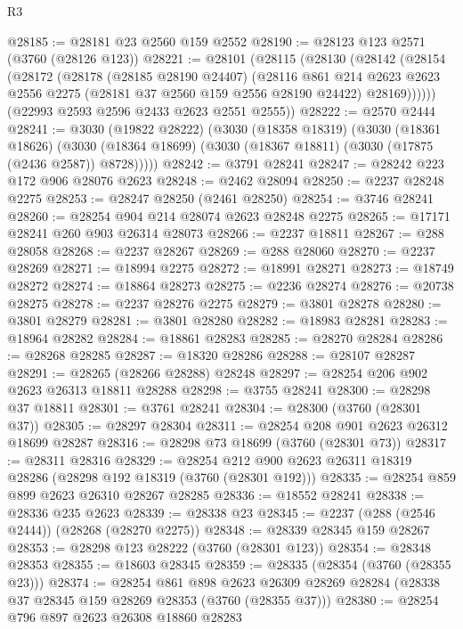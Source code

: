 \begin{lexlean}{R3}
\begin{coremodule}
@28185 := @28181 @23 @2560 @159 @2552
@28190 := @28123 @123 @2571 (@3760 (@28126 @123))
@28221 := @28101
    (@28115
      (@28130
        (@28142
          (@28154
            (@28172
              (@28178
                (@28185 @28190 @24407)
                (@28116
                  @861
                  @214
                  @2623
                  @2623
                  @2556
                  @2275
                  (@28181 @37 @2560 @159 @2556 @28190 @24422)
                  @28169))))))
      (@22993 @2593 @2596 @2433 @2623 @2551 @2555))
@28222 := @2570 @2444
@28241 := @3030
    (@19822 @28222)
    (@3030
      (@18358 @18319)
      (@3030
        (@18361 @18626)
        (@3030 (@18364 @18699) (@3030 (@18367 @18811) (@3030 (@17875 (@2436 @2587)) @8728)))))
@28242 := @3791 @28241
@28247 := @28242 @223 @172 @906 @28076 @2623
@28248 := @2462 @28094
@28250 := @2237 @28248 @2275
@28253 := @28247 @28250 (@2461 @28250)
@28254 := @3746 @28241
@28260 := @28254 @904 @214 @28074 @2623 @28248 @2275
@28265 := @17171 @28241 @260 @903 @26314 @28073
@28266 := @2237 @18811
@28267 := @288 @28058
@28268 := @2237 @28267
@28269 := @288 @28060
@28270 := @2237 @28269
@28271 := @18994 @2275
@28272 := @18991 @28271
@28273 := @18749 @28272
@28274 := @18864 @28273
@28275 := @2236 @28274
@28276 := @20738 @28275
@28278 := @2237 @28276 @2275
@28279 := @3801 @28278
@28280 := @3801 @28279
@28281 := @3801 @28280
@28282 := @18983 @28281
@28283 := @18964 @28282
@28284 := @18861 @28283
@28285 := @28270 @28284
@28286 := @28268 @28285
@28287 := @18320 @28286
@28288 := @28107 @28287
@28291 := @28265 (@28266 @28288) @28248
@28297 := @28254 @206 @902 @2623 @26313 @18811 @28288
@28298 := @3755 @28241
@28300 := @28298 @37 @18811
@28301 := @3761 @28241
@28304 := @28300 (@3760 (@28301 @37))
@28305 := @28297 @28304
@28311 := @28254 @208 @901 @2623 @26312 @18699 @28287
@28316 := @28298 @73 @18699 (@3760 (@28301 @73))
@28317 := @28311 @28316
@28329 := @28254 @212 @900 @2623 @26311 @18319 @28286 (@28298 @192 @18319 (@3760 (@28301 @192)))
@28335 := @28254 @859 @899 @2623 @26310 @28267 @28285
@28336 := @18552 @28241
@28338 := @28336 @235 @2623
@28339 := @28338 @23
@28345 := @2237 (@288 (@2546 @2444)) (@28268 (@28270 @2275))
@28348 := @28339 @28345 @159 @28267
@28353 := @28298 @123 @28222 (@3760 (@28301 @123))
@28354 := @28348 @28353
@28355 := @18603 @28345
@28359 := @28335 (@28354 (@3760 (@28355 @23)))
@28374 := @28254
    @861
    @898
    @2623
    @26309
    @28269
    @28284
    (@28338 @37 @28345 @159 @28269 @28353 (@3760 (@28355 @37)))
@28380 := @28254 @796 @897 @2623 @26308 @18860 @28283

\end{coremodule}
\end{lexlean}
